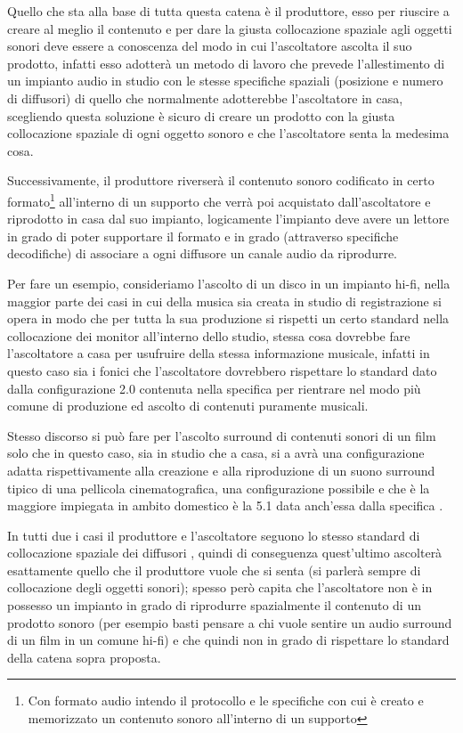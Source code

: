 \documentclass[12pt,a4paper]{report}
\begin{document}
Quello che sta alla base di tutta questa catena è il produttore, esso per riuscire a creare al meglio il contenuto e per dare la giusta collocazione spaziale agli oggetti sonori deve essere a conoscenza del modo in cui l'ascoltatore ascolta il suo prodotto, infatti esso adotterà un metodo di lavoro che prevede l'allestimento di un impianto audio in studio con le stesse specifiche spaziali (posizione e numero di diffusori) di quello che normalmente adotterebbe l'ascoltatore in casa, scegliendo questa soluzione è sicuro di creare un prodotto con la giusta collocazione spaziale di ogni oggetto sonoro e che l'ascoltatore senta la medesima cosa.

Successivamente, il produttore riverserà il contenuto sonoro codificato in certo formato\footnote{Con formato audio intendo il protocollo e le specifiche con cui è creato e memorizzato un contenuto sonoro all'interno di un supporto} all'interno di un supporto che verrà poi acquistato dall'ascoltatore e riprodotto in casa dal suo impianto, logicamente l'impianto deve avere un lettore in grado di poter supportare il formato e in grado (attraverso specifiche decodifiche) di associare a ogni diffusore un canale audio da riprodurre.

Per fare un esempio, consideriamo l'ascolto di un disco in un impianto hi-fi, nella maggior parte dei casi in cui della musica sia creata in studio di registrazione si opera in modo che per tutta la sua produzione si rispetti un certo standard nella collocazione dei monitor all'interno dello studio, stessa cosa dovrebbe fare l'ascoltatore a casa per usufruire della stessa informazione musicale, infatti in questo caso sia i fonici che l'ascoltatore dovrebbero rispettare lo standard dato dalla configurazione 2.0 contenuta nella specifica \cite{5.1} per rientrare nel modo più comune di produzione ed ascolto di contenuti puramente musicali.

Stesso discorso si può fare per l'ascolto surround di contenuti sonori di un film solo che in questo caso, sia in studio che a casa, si a avrà una configurazione adatta rispettivamente alla creazione e alla riproduzione di un suono surround tipico di una pellicola cinematografica, una configurazione possibile e che è la maggiore impiegata in ambito domestico è la 5.1 data anch'essa dalla specifica \cite{5.1}.

In tutti due i casi il produttore e l'ascoltatore seguono lo stesso standard di collocazione spaziale dei diffusori , quindi di conseguenza quest'ultimo ascolterà esattamente quello che il produttore vuole che si senta (si parlerà sempre di collocazione degli oggetti sonori); spesso però capita che l'ascoltatore non è in possesso un impianto in grado di riprodurre spazialmente il contenuto di un prodotto sonoro (per esempio basti pensare a chi vuole sentire un audio surround di un film in un comune hi-fi) e che quindi non in grado di rispettare lo standard della catena sopra proposta.
\end{document}
